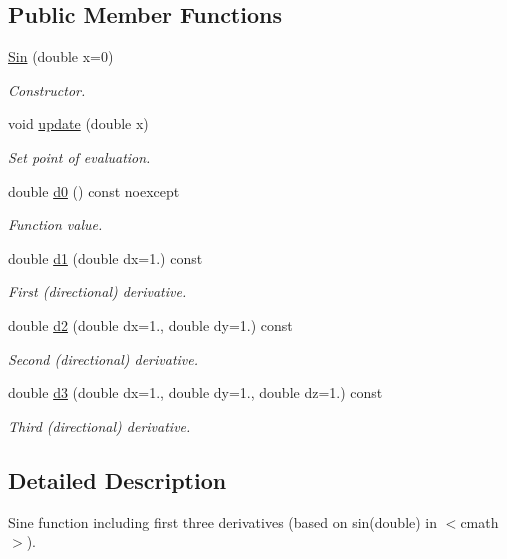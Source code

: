 \subsection*{Public Member Functions}
\begin{DoxyCompactItemize}
\item 
\hyperlink{structFunG_1_1Sin_aa956d10238ebb30a8e037e9f82488a8e}{Sin} (double x=0)
\begin{DoxyCompactList}\small\item\em Constructor. \end{DoxyCompactList}\item 
void \hyperlink{structFunG_1_1Sin_a3f26e1664a29c03e2f29fc2205873850}{update} (double x)
\begin{DoxyCompactList}\small\item\em Set point of evaluation. \end{DoxyCompactList}\item 
double \hyperlink{structFunG_1_1Sin_abae046eecc58398c73f215087460586b}{d0} () const noexcept
\begin{DoxyCompactList}\small\item\em Function value. \end{DoxyCompactList}\item 
double \hyperlink{structFunG_1_1Sin_aaef53b2343e2185e66ec4e9c0319ebdd}{d1} (double dx=1.) const 
\begin{DoxyCompactList}\small\item\em First (directional) derivative. \end{DoxyCompactList}\item 
double \hyperlink{structFunG_1_1Sin_ae0c92547f5da722f0fc642c2ea8f0539}{d2} (double dx=1., double dy=1.) const 
\begin{DoxyCompactList}\small\item\em Second (directional) derivative. \end{DoxyCompactList}\item 
double \hyperlink{structFunG_1_1Sin_a8d8affa45264f36cde9db0bb1464934e}{d3} (double dx=1., double dy=1., double dz=1.) const 
\begin{DoxyCompactList}\small\item\em Third (directional) derivative. \end{DoxyCompactList}\end{DoxyCompactItemize}


\subsection{Detailed Description}
Sine function including first three derivatives (based on sin(double) in $<$cmath$>$). 

